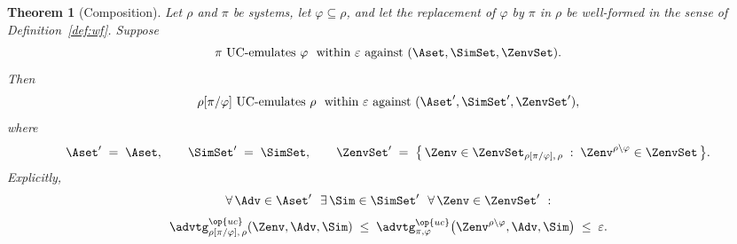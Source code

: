 \documentclass[10pt,oneside,openany]{book}
\theoremstyle{accentdef}
\theoremstyle{accentplain}
\newtheorem{theorem}[definition]{Theorem}
\begin{document}
\begin{theorem}[Composition]\label{thm:comp}
Let $\rho$ and $\pi$ be systems, let $\varphi \subseteq \rho$, and let the replacement of
$\varphi$ by $\pi$ in $\rho$ be
well-formed in the sense of Definition~\ref{def:wf}. Suppose
\[
  \pi \ \text{UC-emulates} \ \varphi \ \text{ within } \varepsilon \text{ against } (\Aset,\SimSet,\ZenvSet) .
\]
Then
\[
  \rho[\pi/\varphi] \ \text{UC-emulates} \ \rho \ \text{ within } \varepsilon \text{ against } (\Aset',\SimSet',\ZenvSet') ,
\]
where
\[
  \Aset' \;=\; \Aset, \qquad
  \SimSet' \;=\; \SimSet, \qquad
  \ZenvSet' \;=\; \bigl\{\, \Zenv \in \ZenvSet_{\rho[\pi/\varphi],\,\rho} \;:\; \Zenv^{\rho \setminus \varphi} \in \ZenvSet \,\bigr\} .
\]
Explicitly,
\[
  \begin{gathered}
  \forall\, \Adv \in \Aset' \ \ \exists\, \Sim \in \SimSet' \ \ \forall\, \Zenv \in \ZenvSet' \ : \\[3pt]
  \advtg^{\op{uc}}_{\rho[\pi/\varphi],\,\rho}(\Zenv,\Adv,\Sim)
  \;\leq\;
  \advtg^{\op{uc}}_{\pi,\varphi}\bigl(\Zenv^{\rho \setminus \varphi},\Adv,\Sim\bigr)
  \;\leq\; \varepsilon .
  \end{gathered}
\]
\end{theorem}
\end{document}
